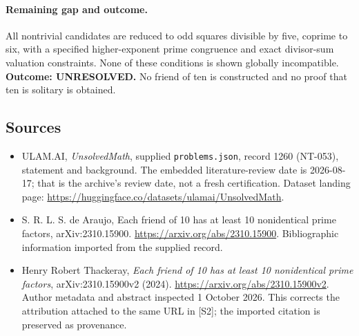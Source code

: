 \documentclass[11pt,a4paper]{article}
\begin{document}
\paragraph{Remaining gap and outcome.}
All nontrivial candidates are reduced to odd squares divisible by five,
coprime to six, with a specified higher-exponent prime congruence and
exact divisor-sum valuation constraints. None of these conditions is
shown globally incompatible. \textbf{Outcome: UNRESOLVED.} No friend
of ten is constructed and no proof that ten is solitary is obtained.

\subsection{Sources}

{\small

\begin{itemize}

\item[\hypertarget{source:1260:1}{S1}] ULAM.AI, \emph{UnsolvedMath}, supplied \texttt{problems.json}, record 1260 (NT-053), statement and background. The embedded literature-review date is 2026-08-17; that is the archive’s review date, not a fresh certification. Dataset landing page: \url{https://huggingface.co/datasets/ulamai/UnsolvedMath}.

\item[\hypertarget{source:1260:2}{S2}] S. R. L. S. de Araujo, Each friend of 10 has at least 10 nonidentical prime factors, arXiv:2310.15900. \url{https://arxiv.org/abs/2310.15900}. Bibliographic information imported from the supplied record.


\item[E1] Henry Robert Thackeray, \emph{Each friend of 10 has at
least 10 nonidentical prime factors}, arXiv:2310.15900v2 (2024).
\url{https://arxiv.org/abs/2310.15900v2}. Author metadata and abstract
inspected 1 October 2026. This corrects the attribution attached to the
same URL in [S2]; the imported citation is preserved as provenance.

\end{itemize}

}

\label{end:1260}
\end{document}
